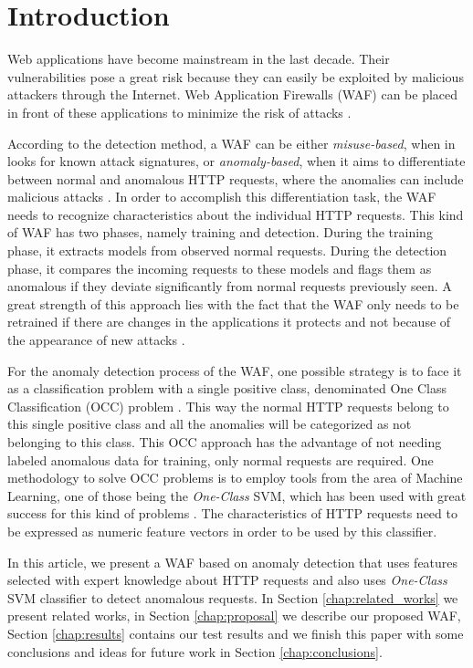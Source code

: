 \section{Introduction}

Web applications have become mainstream in the last decade. Their
vulnerabilities pose a great risk because they can easily be exploited
by malicious attackers through the Internet.
Web Application Firewalls (WAF) can be placed in front of these
applications to minimize the risk of attacks \cite{torranoGimenez2015study}.

According to the detection method, a WAF can be either \textit{misuse-based},
when in looks for known attack signatures,
or \textit{anomaly-based}, when it aims to differentiate between normal and
anomalous HTTP requests, where the anomalies can include malicious attacks
\cite{torranoGimenez2015study}.
In order to accomplish this differentiation task, the WAF needs to recognize
characteristics about the individual HTTP requests.
This kind of WAF has two phases, namely training and detection.
During the training phase, it extracts models from observed normal requests.
During the detection phase, it compares the incoming requests to these models
and flags them as anomalous if they deviate significantly from normal
requests previously seen.
A great strength of this approach lies with the fact that the WAF only needs
to be retrained if there are changes in the applications it protects
and not because of the appearance of new attacks \cite{kruegel2003anomaly}.

For the anomaly detection process of the WAF, one possible strategy is to
face it as a classification problem with a single positive class,
denominated One Class Classification (OCC) problem \cite{khan2014one}.
This way the normal HTTP requests belong to this single positive class and
all the anomalies will be categorized as not belonging to this class.
This OCC approach has the advantage of not needing labeled anomalous data
for training, only normal requests are required.
One methodology to solve OCC problems is to employ tools from the area of
Machine Learning, one of those being the \textit{One-Class} SVM, which has
been used with great success for this kind of problems \cite{khan2014one}.
The characteristics of HTTP requests need to be expressed as numeric
feature vectors in order to be used by this classifier.

In this article, we present a WAF based on anomaly detection that uses
features selected with expert knowledge about HTTP requests and also uses
\textit{One-Class} SVM classifier to detect anomalous requests.
In Section \ref{chap:related_works} we present related works, in Section
\ref{chap:proposal} we describe our proposed WAF, Section \ref{chap:results}
contains our test results and we finish this paper with some conclusions and
ideas for future work in Section \ref{chap:conclusions}.


